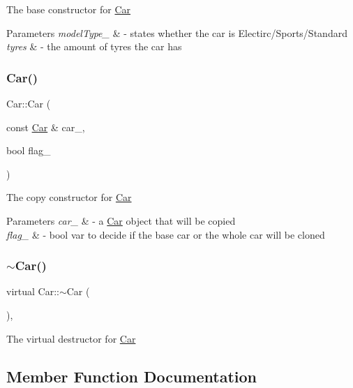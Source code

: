 The base constructor for \mbox{\hyperlink{class_car}{Car}} 
\begin{DoxyParams}{Parameters}
{\em model\+Type\+\_\+} & -\/ states whether the car is Electirc/\+Sports/\+Standard \\
\hline
{\em tyres} & -\/ the amount of tyres the car has \\
\hline
\end{DoxyParams}
\mbox{\label{class_car_a934bad1647e59360395ac3cbd71c6a8d}} 
\subsubsection{\texorpdfstring{Car()}{Car()}\hspace{0.1cm}{\footnotesize\ttfamily [3/3]}}
{\footnotesize\ttfamily Car\+::\+Car (\begin{DoxyParamCaption}\item[{const \mbox{\hyperlink{class_car}{Car}} \&}]{car\+\_\+,  }\item[{bool}]{flag\+\_\+ }\end{DoxyParamCaption})}

The copy constructor for \mbox{\hyperlink{class_car}{Car}} 
\begin{DoxyParams}{Parameters}
{\em car\+\_\+} & -\/ a \mbox{\hyperlink{class_car}{Car}} object that will be copied \\
\hline
{\em flag\+\_\+} & -\/ bool var to decide if the base car or the whole car will be cloned \\
\hline
\end{DoxyParams}
\mbox{\label{class_car_a7f5f88d8a933b9de494e6beb818003f1}} 
\subsubsection{\texorpdfstring{$\sim$\+Car()}{~Car()}}
{\footnotesize\ttfamily virtual Car\+::$\sim$\+Car (\begin{DoxyParamCaption}{ }\end{DoxyParamCaption})\hspace{0.3cm}{\ttfamily [inline]}, {\ttfamily [virtual]}}

The virtual destructor for \mbox{\hyperlink{class_car}{Car}} 

\subsection{Member Function Documentation}
\mbox{\label{class_car_aca44e1a112ae22217c8004e92a86c374}} 
